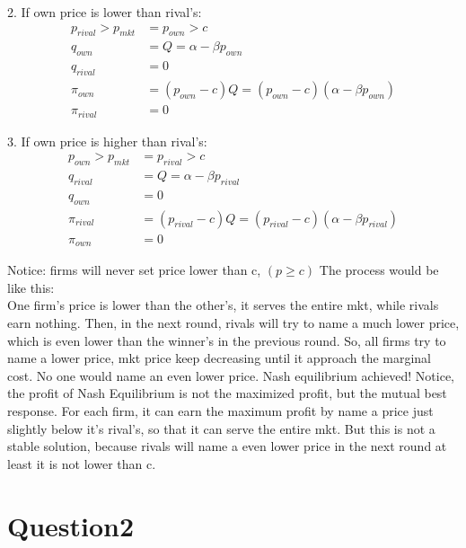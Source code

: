\documentclass[12pt]{article}
\newcommand{\e}[1]{$ #1 $}
\begin{document}
\begin{spacing}{1.5}
            2. If own price is lower than rival's:
            \begin{align*}
                p_{rival} > p_{mkt} & = p_{own} > c\\
                q_{own} & = Q = \alpha - \beta p_{own}\\
                q_{rival} & = 0\\
                \pi_{own} & = (p_{own} - c)Q = (p_{own} - c)(\alpha - \beta p_{own})\\
                \pi_{rival} & = 0
            \end{align*}

            3. If own price is higher than rival's:
            \begin{align*}
                p_{own} > p_{mkt} & = p_{rival} > c\\
                q_{rival} & = Q = \alpha - \beta p_{rival}\\
                q_{own} & = 0\\
                \pi_{rival} & = (p_{rival} - c)Q = (p_{rival} - c)(\alpha - \beta p_{rival})\\
                \pi_{own} & = 0
            \end{align*}
            
            Notice: firms will never set price lower than c, \e{(p \ge c)}
            The process would be like this:\\
            One firm's price is lower than the other's, it serves the entire mkt,
            while rivals earn nothing. Then, in the next round, rivals will try to 
            name a much lower price, which is even lower than the winner's in the previous round.
            So, all firms try to name a lower price, mkt price keep decreasing until it approach the
            marginal cost. No one would name an even lower price. Nash equilibrium achieved!
            Notice, the profit of Nash Equilibrium is not the maximized profit, but the mutual
            best response.
            For each firm, it can earn the maximum profit by name a price just slightly below it's
            rival's, so that it can serve the entire mkt. But this is not a stable solution, because
            rivals will name a even lower price in the next round at least it is not lower than c.




    \section{Question2}
            

\end{spacing}
\end{document}
